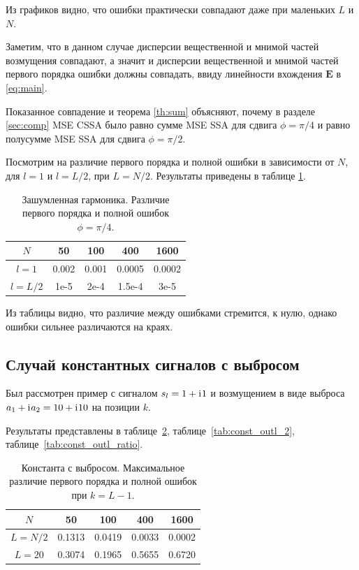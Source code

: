 \documentclass[specialist,
               substylefile = spbu.rtx,
               subf,href,colorlinks=true, 12pt]{disser}
\begin{document}
Из графиков видно, что ошибки практически совпадают даже при маленьких $L$ и $N$.

Заметим, что в данном случае дисперсии вещественной и мнимой частей возмущения совпадают, а значит и дисперсии вещественной и мнимой частей первого порядка ошибки должны совпадать, ввиду линейности вхождения $\mathbf{E}$ в \eqref{eq:main}.

Показанное совпадение и теорема \ref{th:sum} объясняют, почему в разделе \ref{sec:comp} MSE CSSA было равно сумме MSE SSA для сдвига $\phi = \pi/4$ и равно полусумме MSE SSA для сдвига $\phi = \pi/2$.

Посмотрим на различие первого порядка и полной ошибки в зависимости от $N$, для $l = 1$ и $l = L / 2$, при $L = N / 2$. Результаты приведены в таблице \ref{tab:harm_conv_comp}.

\begin{table}[H]
	\begin{center}
		\caption{Зашумленная гармоника. Различие первого порядка и полной ошибок $\phi = \pi/4$.}
		\label{tab:harm_conv_comp}
		\begin{tabular}{|c|c|c|c|c|}
			\hline
			$N$	& 50 & 100 & 400 & 1600 \\
			\hline
			$l = 1$ & 0.002  & 0.001  & 0.0005 & 0.0002 \\
			\hline
			$l = L / 2$ & 1e-5  & 2e-4  & 1.5e-4 & 3e-5 \\
			\hline
		\end{tabular}
	\end{center}
\end{table}

Из таблицы видно, что различие между ошибками стремится, к нулю, однако ошибки сильнее различаются на краях.

\subsection{Случай константных сигналов с выбросом}

Был рассмотрен пример с сигналом $s_l = 1 + \mathrm{i}\mkern1mu 1$ и возмущением в виде выброса $a_1 + \mathrm{i}\mkern1mu a_2 = 10 + \mathrm{i}\mkern1mu 10$ на позиции $k$.

Результаты представлены в таблице~\ref{tab:const_outl_1}, таблице~\ref{tab:const_outl_2}, таблице~\ref{tab:const_outl_ratio}.

\begin{table}[H]
	\begin{center}
		\caption{Константа с выбросом. Максимальное различие первого порядка и полной ошибок при $k = L - 1$.}
		\label{tab:const_outl_1}
		\begin{tabular}{|c|c|c|c|c|}
			\hline
			$N$	& 50 & 100 & 400 & 1600 \\
			\hline
			$L = N / 2$ & 0.1313  & 0.0419  & 0.0033 & 0.0002 \\
			\hline
			$L = 20$ & 0.3074  & 0.1965  & 0.5655 & 0.6720 \\
			\hline
		\end{tabular}
	\end{center}
\end{table}
\end{document}
